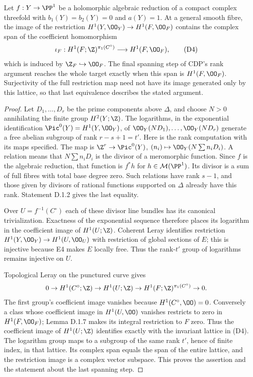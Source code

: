 \begin{proposition}[D.1.10; Proved]\label{st:D.1.10}
Let $f:Y\to\PP^1$ be a holomorphic algebraic reduction of a compact
complex threefold with $b_1(Y)=b_2(Y)=0$ and $a(Y)=1$.
At a general smooth fibre, the image of the restriction
$H^1(Y,\OO_Y)\to H^1(F,\OO_F)$ contains the complex span of
the coefficient homomorphism
\[
\iota_F:H^1(F;\Z)^{\pi_1(C^\circ)}
 \longrightarrow H^1(F,\OO_F),                         \tag{D4}
\]
which is induced by $\Z_F\hookrightarrow\OO_F$.
The final spanning step of CDP's rank argument reaches the whole
target exactly when this span is $H^1(F,\OO_F)$. Surjectivity of
the full restriction map need not have its image generated only by
this lattice, so that last equivalence describes the stated argument.
\end{proposition}
\begin{proof}
Let $D_1,\ldots,D_r$ be the prime components above $\Delta$, and
choose $N>0$ annihilating the finite group $H^2(Y;\Z)$.
The logarithms, in the exponential identification
$\Pic^0(Y)=H^1(Y,\OO_Y)$, of
$\OO_Y(ND_1),\ldots,\OO_Y(ND_r)$ generate a free abelian
subgroup of rank $r-s+1=t'$.
Here is the rank computation with its maps specified. The map is
$\Z^r\to\Pic^0(Y)$, $(n_i)\mapsto\OO_Y(N\sum n_iD_i)$.
A relation means that $N\sum n_iD_i$ is the divisor of a
meromorphic function. Since $f$ is the algebraic reduction, that
function is $f^*h$ for $h\in\mathcal M(\PP^1)$.
Its divisor is a sum of full fibres with total base degree zero.
Such relations have rank $s-1$, and those given by divisors of
rational functions supported on $\Delta$ already have this rank.
Statement D.1.2 gives the last equality.

Over $U=f^{-1}(C^\circ)$ each of these divisor line bundles has
its canonical trivialization. Exactness of the exponential sequence
therefore places its logarithm in the coefficient image of
$H^1(U;\Z)$. Coherent Leray identifies restriction
$H^1(Y,\OO_Y)\to H^1(U,\OO_U)$ with restriction of global
sections of $E$; this is injective because E4 makes $E$ locally free.
Thus the rank-$t'$ group of logarithms remains injective on $U$.

Topological Leray on the punctured curve gives
\[
0\to H^1(C^\circ;\Z)\to H^1(U;\Z)
\to H^1(F;\Z)^{\pi_1(C^\circ)}\to0.
\]
The first group's coefficient image vanishes because
$H^1(C^\circ,\OO)=0$. Conversely a class whose coefficient image
in $H^1(U,\OO)$ vanishes restricts to zero in $H^1(F,\OO_F)$;
Lemma D.1.7 makes its integral restriction to $F$ zero. Thus the
coefficient image of $H^1(U;\Z)$ identifies exactly with the
invariant lattice in (D4). The logarithm group maps to a subgroup
of the same rank $t'$, hence of finite index, in that lattice.
Its complex span equals the span of the entire lattice, and the
restriction image is a complex vector subspace. This proves the
assertion and the statement about the last spanning step.
\end{proof}

